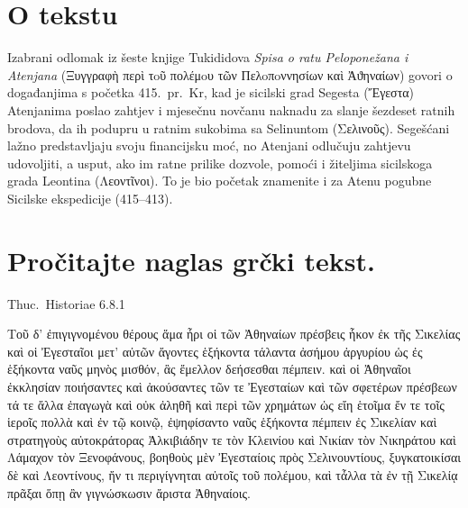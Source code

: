 


\section*{O tekstu}

Izabrani odlomak iz šeste knjige Tukididova \textit{Spisa o ratu Peloponežana i Atenjana} \textgreek[variant=ancient]{(Ξυγγραφὴ περὶ τoῦ πολέμoυ τῶν Пελoπoννησίων καὶ Ἀϑηναίων)} govori o događanjima s početka 415.\ pr.~Kr, kad je sicilski grad Segesta \textgreek[variant=ancient]{(Ἔγεστα)} Atenjanima poslao zahtjev i mjesečnu novčanu naknadu za slanje šezdeset ratnih brodova, da ih podupru u ratnim sukobima sa Selinuntom \textgreek[variant=ancient]{(Σελινοῦς).} Segešćani lažno predstavljaju svoju financijsku moć, no Atenjani odlučuju zahtjevu udovoljiti, a usput, ako im ratne prilike dozvole, pomoći i žiteljima sicilskoga grada Leontina \textgreek[variant=ancient]{(Λεοντῖνοι).} To je bio početak znamenite i za Atenu pogubne Sicilske ekspedicije (415–413).


\section*{Pročitajte naglas grčki tekst.}


Thuc.\ Historiae 6.8.1

\medskip

{\large
\begin{greek}
\noindent Τοῦ δ' ἐπιγιγνομένου θέρους ἅμα ἦρι οἱ τῶν Ἀθηναίων πρέσβεις ἧκον ἐκ τῆς Σικελίας καὶ οἱ Ἐγεσταῖοι μετ' αὐτῶν ἄγοντες ἑξήκοντα τάλαντα ἀσήμου ἀργυρίου ὡς ἐς ἑξήκοντα ναῦς μηνὸς μισθόν, ἃς ἔμελλον δεήσεσθαι πέμπειν. καὶ οἱ Ἀθηναῖοι ἐκκλησίαν ποιήσαντες καὶ ἀκούσαντες τῶν τε Ἐγεσταίων καὶ τῶν σφετέρων πρέσβεων τά τε ἄλλα ἐπαγωγὰ καὶ οὐκ ἀληθῆ καὶ περὶ τῶν χρημάτων ὡς εἴη ἑτοῖμα ἔν τε τοῖς ἱεροῖς πολλὰ καὶ ἐν τῷ κοινῷ, ἐψηφίσαντο ναῦς ἑξήκοντα πέμπειν ἐς Σικελίαν καὶ στρατηγοὺς αὐτοκράτορας Ἀλκιβιάδην τε τὸν Κλεινίου καὶ Νικίαν τὸν Νικηράτου καὶ Λάμαχον τὸν Ξενοφάνους, βοηθοὺς μὲν Ἐγεσταίοις πρὸς Σελινουντίους, ξυγκατοικίσαι δὲ καὶ Λεοντίνους, ἤν τι περιγίγνηται αὐτοῖς τοῦ πολέμου, καὶ τἆλλα τὰ ἐν τῇ Σικελίᾳ πρᾶξαι ὅπῃ ἂν γιγνώσκωσιν ἄριστα Ἀθηναίοις.


\end{greek}

}

